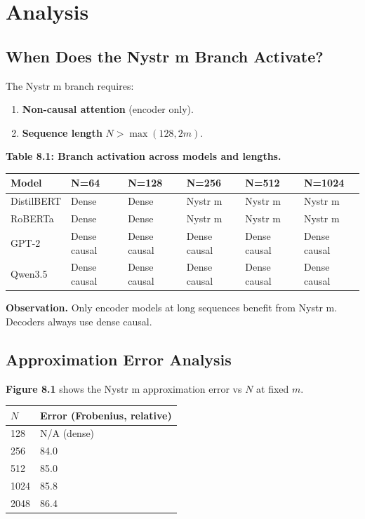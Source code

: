 
\section{Analysis}

\subsection{When Does the Nystr m Branch Activate?}

The Nystr m branch requires:

\begin{enumerate}
\item \textbf{Non-causal attention} (encoder only).
\item \textbf{Sequence length} $N > \max(128, 2m)$.

\end{enumerate}
\textbf{Table 8.1: Branch activation across models and lengths.}

\begin{table}[H]
\centering
\small
\begin{tabular}{llllll}
\toprule
\textbf{Model} & \textbf{N=64} & \textbf{N=128} & \textbf{N=256} & \textbf{N=512} & \textbf{N=1024} \\
\midrule
DistilBERT & Dense & Dense & Nystr m & Nystr m & Nystr m \\
RoBERTa & Dense & Dense & Nystr m & Nystr m & Nystr m \\
GPT-2 & Dense causal & Dense causal & Dense causal & Dense causal & Dense causal \\
Qwen3.5 & Dense causal & Dense causal & Dense causal & Dense causal & Dense causal \\
\bottomrule
\end{tabular}
\end{table}

\textbf{Observation.} Only encoder models at long sequences benefit from 
Nystr m. Decoders always use dense causal.

\subsection{Approximation Error Analysis}

\textbf{Figure 8.1} shows the Nystr m approximation error vs $N$ at fixed $m$.

\begin{table}[H]
\centering
\small
\begin{tabular}{ll}
\toprule
\textbf{$N$} & \textbf{Error (Frobenius, relative)} \\
\midrule
128 & N/A (dense) \\
256 & 84.0 \\
512 & 85.0 \\
1024 & 85.8 \\
2048 & 86.4 \\
\bottomrule
\end{tabular}
\end{table}

